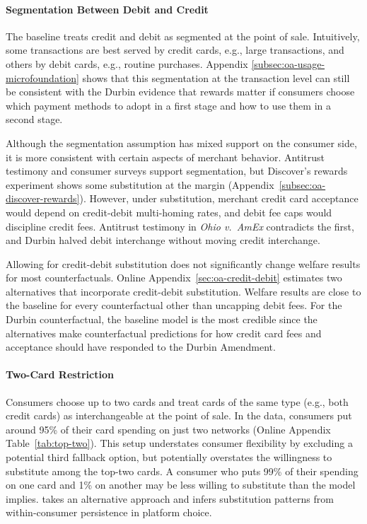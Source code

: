 \documentclass[main.tex]{subfiles}
\begin{document}
\paragraph{Segmentation Between Debit and Credit}
\label{subsubsec:model-credit-debit-segmentation}

The baseline treats credit and debit as segmented at the point of sale.
Intuitively, some transactions are best served by credit cards, e.g., large transactions, and others by debit cards, e.g., routine purchases.
Appendix \ref{subsec:oa-usage-microfoundation} shows that this segmentation at the transaction level can still be consistent with the Durbin evidence that rewards matter if consumers choose which payment methods to adopt in a first stage and how to use them in a second stage.

Although the segmentation assumption has mixed support on the consumer side, it is more consistent with certain aspects of merchant behavior.
Antitrust testimony and consumer surveys support segmentation, but Discover's rewards experiment shows some substitution at the margin (Appendix~\ref{subsec:oa-discover-rewards}).
However, under substitution, merchant credit card acceptance would depend on credit-debit multi-homing rates, and debit fee caps would discipline credit fees.
Antitrust testimony in \emph{Ohio v.\ AmEx} contradicts the first, and Durbin halved debit interchange without moving credit interchange.

Allowing for credit-debit substitution does not significantly change welfare results for most counterfactuals.
Online Appendix~\ref{sec:oa-credit-debit} estimates two alternatives that incorporate credit-debit substitution.
Welfare results are close to the baseline for every counterfactual other than uncapping debit fees.
For the Durbin counterfactual, the baseline model is the most credible since the alternatives make counterfactual predictions for how credit card fees and acceptance should have responded to the Durbin Amendment.

\paragraph{Two-Card Restriction}
Consumers choose up to two cards and treat cards of the same type (e.g., both credit cards) as interchangeable at the point of sale.
In the data, consumers put around 95\% of their card spending on just two networks (Online Appendix Table~\ref{tab:top-two}).
This setup understates consumer flexibility by excluding a potential third fallback option, but potentially overstates the willingness to substitute among the top-two cards.
A consumer who puts 99\% of their spending on one card and 1\% on another may be less willing to substitute than the model implies.
\textcite{Sullivan2025} takes an alternative approach and infers substitution patterns from within-consumer persistence in platform choice.
\end{document}
